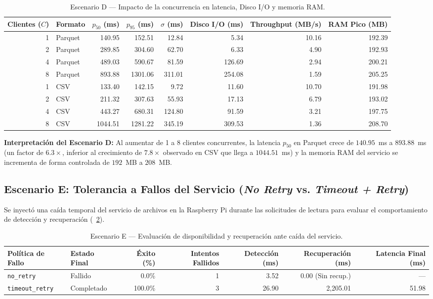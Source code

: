 \documentclass[11pt,a4paper]{article}
\begin{document}
\begin{table}[H]
\centering
\caption{Escenario D — Impacto de la concurrencia en latencia, Disco I/O y memoria RAM.}
\label{tab:scenario_d}
\begin{tabular}{rlrrrrrr}
\toprule
\textbf{Clientes ($C$)} & \textbf{Formato} & \textbf{$p_{50}$ (ms)} & \textbf{$p_{95}$ (ms)} & \textbf{$\sigma$ (ms)} & \textbf{Disco I/O (ms)} & \textbf{Throughput (MB/s)} & \textbf{RAM Pico (MB)} \\
\midrule
1 & Parquet & 140.95 & 152.51 & 12.84 & 5.34 & 10.16 & 192.39 \\
2 & Parquet & 289.85 & 304.60 & 62.70 & 6.33 & 4.90 & 192.93 \\
4 & Parquet & 489.03 & 590.67 & 81.59 & 126.69 & 2.94 & 200.21 \\
8 & Parquet & 893.88 & 1301.06 & 311.01 & 254.08 & 1.59 & 205.25 \\
\midrule
1 & CSV & 133.40 & 142.15 & 9.72 & 11.60 & 10.70 & 191.98 \\
2 & CSV & 211.32 & 307.63 & 55.93 & 17.13 & 6.79 & 193.02 \\
4 & CSV & 443.27 & 680.31 & 124.80 & 91.59 & 3.21 & 197.75 \\
8 & CSV & 1044.51 & 1281.22 & 345.19 & 309.53 & 1.36 & 208.70 \\
\bottomrule
\end{tabular}
\end{table}

\textbf{Interpretación del Escenario D:} Al aumentar de 1 a 8 clientes concurrentes, la latencia $p_{50}$ en Parquet crece de $140.95$~ms a $893.88$~ms (un factor de $6.3\times$, inferior al crecimiento de $7.8\times$ observado en CSV que llega a $1044.51$~ms) y la memoria RAM del servicio se incrementa de forma controlada de $192$~MB a $208$~MB.

\subsection{Escenario E: Tolerancia a Fallos del Servicio (\textit{No Retry} vs. \textit{Timeout + Retry})}
Se inyectó una caída temporal del servicio de archivos en la Raspberry Pi durante las solicitudes de lectura para evaluar el comportamiento de detección y recuperación (\Cuadro~\ref{tab:scenario_e}).

\begin{table}[H]
\centering
\caption{Escenario E — Evaluación de disponibilidad y recuperación ante caída del servicio.}
\label{tab:scenario_e}
\begin{tabular}{llrrrrr}
\toprule
\textbf{Política de Fallo} & \textbf{Estado Final} & \textbf{Éxito (\%)} & \textbf{Intentos Fallidos} & \textbf{Detección (ms)} & \textbf{Recuperación (ms)} & \textbf{Latencia Final (ms)} \\
\midrule
\texttt{no\_retry} & Fallido & 0.0\% & 1 & 3.52 & 0.00 (Sin recup.) & --- \\
\texttt{timeout\_retry} & Completado & 100.0\% & 3 & 26.90 & 2,205.01 & 51.98 \\
\bottomrule
\end{tabular}
\end{table}
\end{document}
